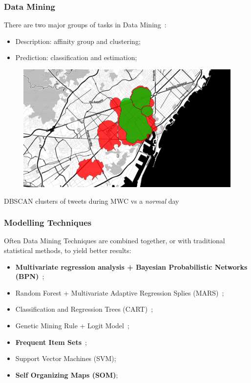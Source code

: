 \documentclass[hyperref={pdfpagelabels=true}]{beamer}
\begin{document}
\begin{frame}
\frametitle{Data Mining}
There are two major groups of tasks in Data Mining~\cite{sets}:
\begin{itemize}
\item Description: affinity group and clustering;
\item Prediction: classification and estimation;
\end{itemize}
\begin{figure}
\includegraphics[scale=0.35]{mwc_nonmwc_1000_0125.png}
\end{figure}
\tiny{DBSCAN clusters of tweets during MWC vs a \textit{normal} day}
\end{frame}

\begin{frame}
\frametitle{Modelling Techniques}
Often Data Mining Techniques are combined together, or with traditional statistical methods, to yield better results:
\begin{itemize}
\item \textbf{Multivariate regression analysis + Bayesian Probabilistic Networks (BPN)}~\cite{bayesian};
\item Random Forest + Multivariate Adaptive Regression Splies (MARS)~\cite{mars};
\item Classification and Regression Trees (CART)~\cite{cart};
\item Genetic Mining Rule + Logit Model~\cite{bayesian};
\item \textbf{Frequent Item Sets}~\cite{sets};
\item Support Vector Machines (SVM); 
\item \textbf{Self Organizing Maps (SOM)};
\end{itemize}
\end{frame}
\end{document}
